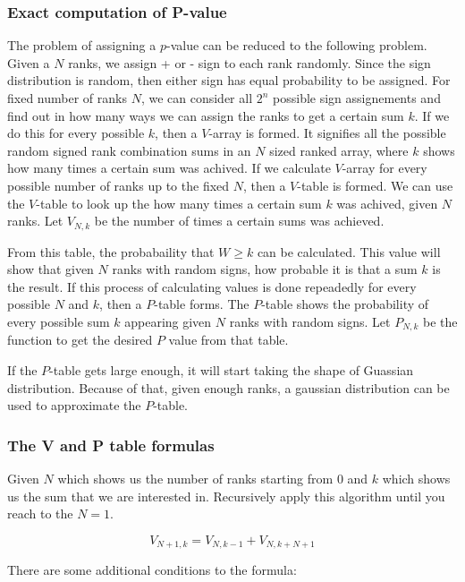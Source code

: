\documentclass[12pt]{article}
\begin{document}
\subsubsection{Exact computation of P-value}
The problem of assigning a $p$-value can be reduced to the following problem. Given a $N$ ranks, we assign + or - sign to each rank randomly. Since the sign distribution is random, then either sign has equal probability to be assigned. For fixed number of ranks $N$, we can consider all $2^n$ possible sign assignements and find out in how many ways we can assign the ranks to get a certain sum $k$. If we do this for every possible $k$, then a $V$-array is formed. It signifies all the possible random signed rank combination sums in an $N$ sized ranked array, where $k$ shows how many times a certain sum was achived. If we calculate $V$-array for every possible number of ranks up to the fixed $N$, then a $V$-table is formed. We can use the $V$-table to look up the how many times a certain sum $k$ was achived, given $N$ ranks. Let $V_{N, k}$ be the number of times a certain sums was achieved.

From this table, the probabaility that $W\geq k$ can be calculated. This value will show that given $N$ ranks with random signs, how probable it is that a sum $k$ is the result. If this process of calculating values is done repeadedly for every possible $N$ and $k$, then a $P$-table forms. The $P$-table shows the probability of every possible sum $k$ appearing given $N$ ranks with random signs. Let $P_{N, k}$ be the function to get the desired $P$ value from that table.

If the $P$-table gets large enough, it will start taking the shape of Guassian distribution. Because of that, given enough ranks, a gaussian distribution can be used to approximate the $P$-table.

\subsubsection{The V and P table formulas}
\label{sec:v_p_table_formulas}

Given $N$ which shows us the number of ranks starting from $0$ and $k$ which shows us the sum that we are interested in. Recursively apply this algorithm until you reach to the $N = 1$.

\begin{equation}
  V_{N+1, k} = V_{N, k-1} + V_{N, k+N+1}
\end{equation}

There are some additional conditions to the formula:
\end{document}
